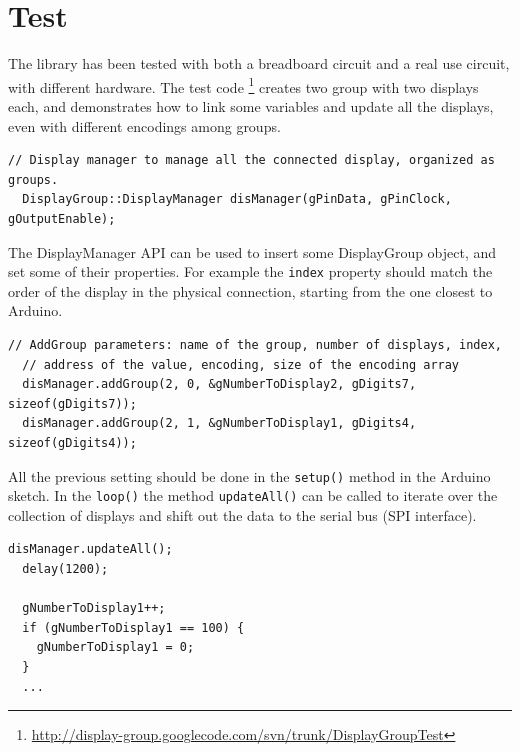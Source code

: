 \documentclass[11pt,english]{article}
\newcommand{\code}[1]{\texttt{#1}}
\begin{document}
\pagebreak

\section{Test}\label{sec:test}

The library has been tested with both a breadboard circuit and a real use circuit, with different hardware.
The test code \footnote{\url{http://display-group.googlecode.com/svn/trunk/DisplayGroupTest}} creates two group 
with two displays each, and demonstrates how to link some variables and update all the displays, even with 
different encodings among groups.
%                                       
\begin{lstlisting}[label=lis:display-manager-create, caption=DisplayManager: constructor call]
  // Display manager to manage all the connected display, organized as groups.
  DisplayGroup::DisplayManager disManager(gPinData, gPinClock, gOutputEnable);
\end{lstlisting}

The DisplayManager API can be used to insert some DisplayGroup object, and set some of their properties.
For example the \code{index} property should match the order of the display in the physical connection, 
starting from the one closest to Arduino.
%                                       
\begin{lstlisting}[label=lis:add-group, caption=DisplayManager: adding groups to the manager]
  // AddGroup parameters: name of the group, number of displays, index, 
  // address of the value, encoding, size of the encoding array
  disManager.addGroup(2, 0, &gNumberToDisplay2, gDigits7, sizeof(gDigits7));
  disManager.addGroup(2, 1, &gNumberToDisplay1, gDigits4, sizeof(gDigits4));
\end{lstlisting}

All the previous setting should be done in the \code{setup()} method in the Arduino sketch.
In the \code{loop()} the method \code{updateAll()} can be called to iterate over the collection 
of displays and shift out the data to the serial bus (SPI interface).
%                                       
\begin{lstlisting}[label=lis:display-manager-updateall, caption=DisplayManager: update all groups]
  disManager.updateAll();
  delay(1200);

  gNumberToDisplay1++;
  if (gNumberToDisplay1 == 100) {
    gNumberToDisplay1 = 0;
  }
  ...
\end{lstlisting}
\end{document}
